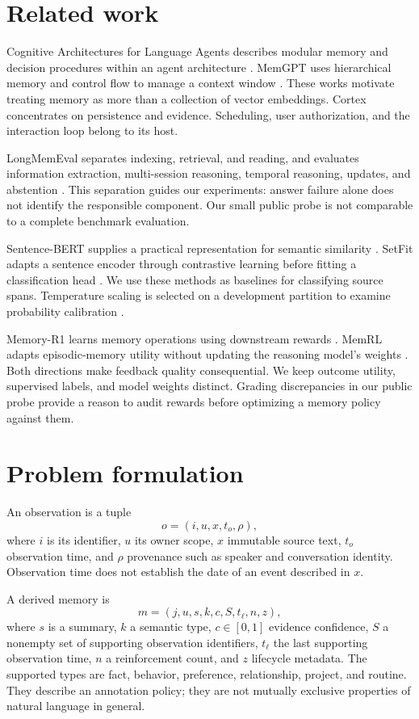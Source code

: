 \documentclass[11pt]{article}
\begin{document}
\section{Related work}
Cognitive Architectures for Language Agents describes modular memory and decision procedures within an agent architecture \citep{coala}. MemGPT uses hierarchical memory and control flow to manage a context window \citep{memgpt}. These works motivate treating memory as more than a collection of vector embeddings. Cortex concentrates on persistence and evidence. Scheduling, user authorization, and the interaction loop belong to its host.

LongMemEval separates indexing, retrieval, and reading, and evaluates information extraction, multi-session reasoning, temporal reasoning, updates, and abstention \citep{longmem}. This separation guides our experiments: answer failure alone does not identify the responsible component. Our small public probe is not comparable to a complete benchmark evaluation.

Sentence-BERT supplies a practical representation for semantic similarity \citep{sbert}. SetFit adapts a sentence encoder through contrastive learning before fitting a classification head \citep{setfit}. We use these methods as baselines for classifying source spans. Temperature scaling is selected on a development partition to examine probability calibration \citep{calibration}.

Memory-R1 learns memory operations using downstream rewards \citep{memoryr1}. MemRL adapts episodic-memory utility without updating the reasoning model's weights \citep{memrl}. Both directions make feedback quality consequential. We keep outcome utility, supervised labels, and model weights distinct. Grading discrepancies in our public probe provide a reason to audit rewards before optimizing a memory policy against them.

\section{Problem formulation}
An observation is a tuple
\[
 o=(i,u,x,t_o,\rho),
\]
where $i$ is its identifier, $u$ its owner scope, $x$ immutable source text, $t_o$ observation time, and $\rho$ provenance such as speaker and conversation identity. Observation time does not establish the date of an event described in $x$.

A derived memory is
\[
 m=(j,u,s,k,c,S,t_\ell,n,z),
\]
where $s$ is a summary, $k$ a semantic type, $c\in[0,1]$ evidence confidence, $S$ a nonempty set of supporting observation identifiers, $t_\ell$ the last supporting observation time, $n$ a reinforcement count, and $z$ lifecycle metadata. The supported types are fact, behavior, preference, relationship, project, and routine. They describe an annotation policy; they are not mutually exclusive properties of natural language in general.
\end{document}
